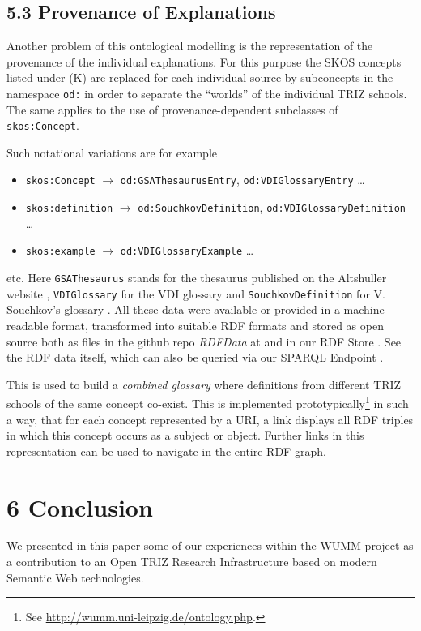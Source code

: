 \documentclass[12pt,a4paper]{article}
\begin{document}
\subsection*{5.3 Provenance of Explanations}

Another problem of this ontological modelling is the representation of the
provenance of the individual explanations. For this purpose the SKOS concepts
listed under (K) are replaced for each individual source by subconcepts in the
namespace \texttt{od:} in order to separate the “worlds” of the individual
TRIZ schools. The same applies to the use of provenance-dependent subclasses
of \texttt{skos:Concept}.

Such notational variations are for example
\begin{itemize}
\item \texttt{skos:Concept} $\to$ \texttt{od:GSAThesaurusEntry},
  \texttt{od:VDIGlossaryEntry} \ldots
\item \texttt{skos:definition} $\to$ \texttt{od:SouchkovDefinition},
  \texttt{od:VDIGlossaryDefinition} \ldots
\item \texttt{skos:example} $\to$ \texttt{od:VDIGlossaryExample} \ldots
\end{itemize}
etc. Here \texttt{GSAThesaurus} stands for the thesaurus published on the
Altshuller website \cite{1}, \texttt{VDIGlossary} for the VDI glossary
\cite{24} and \texttt{SouchkovDefinition} for V. Souchkov's glossary
\cite{21}. All these data were available or provided in a machine-readable
format, transformed into suitable RDF formats and stored as open source both
as files in the github repo \emph{RDFData} at \cite{25} and in our RDF Store
\cite{28}. See the RDF data itself, which can also be queried via our SPARQL
Endpoint \cite{29}.

This is used to build a \emph{combined glossary} where definitions from
different TRIZ schools of the same concept co-exist. This is implemented
prototypically\footnote{See \url{http://wumm.uni-leipzig.de/ontology.php}.} in
such a way, that for each concept represented by a URI, a link displays all
RDF triples in which this concept occurs as a subject or object. Further links
in this representation can be used to navigate in the entire RDF graph.

\section*{6 Conclusion}

We presented in this paper some of our experiences within the WUMM project
\cite{26} as a contribution to an Open TRIZ Research Infrastructure based on
modern Semantic Web technologies.
\end{document}
